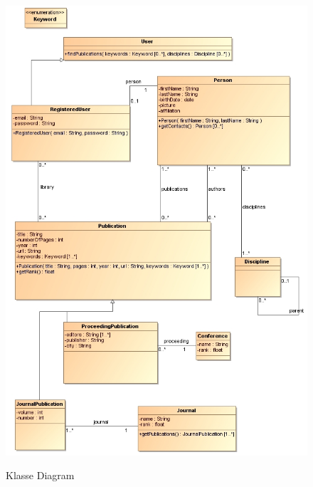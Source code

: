 \begin{figure}[p]
    \centering
    \href{run:./class-diagram.png}{\includegraphics[width=\columnwidth]{class-diagram.png}}
    \caption{Klasse Diagram}
    \label{fig:class-diagram}
\end{figure}
